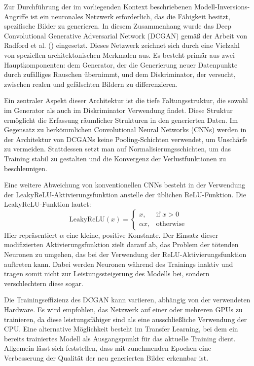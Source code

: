 Zur Durchführung der im vorliegenden Kontext beschriebenen Modell-Inversions-Angriffe ist ein neuronales Netzwerk erforderlich, das die Fähigkeit besitzt, spezifische Bilder zu generieren. In diesem Zusammenhang wurde das Deep Convolutional Generative Adversarial Network (DCGAN) gemäß der Arbeit von Radford et al. (\cite{radford_unsupervised_2016}) eingesetzt. Dieses Netzwerk zeichnet sich durch eine Vielzahl von speziellen architektonischen Merkmalen aus. Es besteht primär aus zwei Hauptkomponenten: dem Generator, der die Generierung neuer Datenpunkte durch zufälliges Rauschen übernimmt, und dem Diskriminator, der versucht, zwischen realen und gefälschten Bildern zu differenzieren.

Ein zentraler Aspekt dieser Architektur ist die tiefe Faltungsstruktur, die sowohl im Generator als auch im Diskriminator Verwendung findet. Diese Struktur ermöglicht die Erfassung räumlicher Strukturen in den generierten Daten. Im Gegensatz zu herkömmlichen Convolutional Neural Networks (CNNs) werden in der Architektur von DCGANs keine Pooling-Schichten verwendet, um Unschärfe zu vermeiden. Stattdessen setzt man auf Normalisierungsschichten, um das Training stabil zu gestalten und die Konvergenz der Verlustfunktionen zu beschleunigen.

Eine weitere Abweichung von konventionellen CNNs besteht in der Verwendung der LeakyReLU-Aktivierungsfunktion anstelle der üblichen ReLU-Funktion. Die LeakyReLU-Funktion lautet:
\[
\text{LeakyReLU}(x) = \begin{cases}
	x, & \text{if } x > 0 \\
	\alpha x, & \text{otherwise}
\end{cases}
\]
Hier repräsentiert $\alpha$ eine kleine, positive Konstante. Der Einsatz dieser modifizierten Aktivierungsfunktion zielt darauf ab, das Problem der \glqq tötenden Neuronen\grqq{} zu umgehen, das bei der Verwendung der ReLU-Aktivierungsfunktion auftreten kann. Dabei werden Neuronen während des Trainings inaktiv und tragen somit nicht zur Leistungssteigerung des Modells bei, sondern verschlechtern diese sogar.

Die Trainingseffizienz des DCGAN kann variieren, abhängig von der verwendeten Hardware. Es wird empfohlen, das Netzwerk auf einer oder mehreren GPUs zu trainieren, da diese leistungsfähiger sind als eine ausschließliche Verwendung der CPU. Eine alternative Möglichkeit besteht im Transfer Learning, bei dem ein bereits trainiertes Modell als Ausgangspunkt für das aktuelle Training dient. Allgemein lässt sich feststellen, dass mit zunehmenden Epochen eine Verbesserung der Qualität der neu generierten Bilder erkennbar ist.


